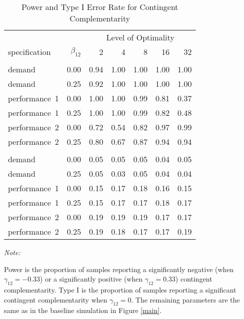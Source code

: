 \begin{table}

\caption{\label{tab:mix-optimality-table}Power and Type I Error Rate for Contingent
                   Complementarity}
\centering
\begin{threeparttable}
\begin{tabular}[t]{lrrrrrr}
\toprule
\multicolumn{2}{c}{ } & \multicolumn{5}{c}{Level of Optimality} \\
\cmidrule(l{3pt}r{3pt}){3-7}
specification & $\beta_{12}$ & 2 & 4 & 8 & 16 & 32\\
\midrule
\addlinespace[0.3em]
\multicolumn{7}{c}{\textbf{Power}}\\
\hspace{1em}demand & 0.00 & 0.94 & 1.00 & 1.00 & 1.00 & 1.00\\
\hspace{1em}demand & 0.25 & 0.92 & 1.00 & 1.00 & 1.00 & 1.00\\
\hspace{1em}performance~1 & 0.00 & 1.00 & 1.00 & 0.99 & 0.81 & 0.37\\
\hspace{1em}performance~1 & 0.25 & 1.00 & 1.00 & 0.99 & 0.82 & 0.48\\
\hspace{1em}performance~2 & 0.00 & 0.72 & 0.54 & 0.82 & 0.97 & 0.99\\
\hspace{1em}performance~2 & 0.25 & 0.80 & 0.67 & 0.87 & 0.94 & 0.94\\
\addlinespace[0.3em]
\multicolumn{7}{c}{\textbf{Type I}}\\
\hspace{1em}demand & 0.00 & 0.05 & 0.05 & 0.05 & 0.04 & 0.05\\
\hspace{1em}demand & 0.25 & 0.05 & 0.03 & 0.05 & 0.04 & 0.04\\
\hspace{1em}performance~1 & 0.00 & 0.15 & 0.17 & 0.18 & 0.16 & 0.15\\
\hspace{1em}performance~1 & 0.25 & 0.15 & 0.17 & 0.17 & 0.18 & 0.17\\
\hspace{1em}performance~2 & 0.00 & 0.19 & 0.19 & 0.19 & 0.17 & 0.17\\
\hspace{1em}performance~2 & 0.25 & 0.19 & 0.18 & 0.17 & 0.17 & 0.19\\
\bottomrule
\end{tabular}
\begin{tablenotes}
\item \textit{Note: } 
\item Power is the proportion of samples reporting a significantly negative (when $\gamma_{12} = -0.33$) or a significantly positive (when $\gamma_{12} = 0.33$) contingent complementarity. Type I is the proportion of samples reporting a significant contingent complementarity when $\gamma_{12} = 0$. The remaining parameters are the same as in the baseline simulation in Figure \ref{main}.
\end{tablenotes}
\end{threeparttable}
\end{table}